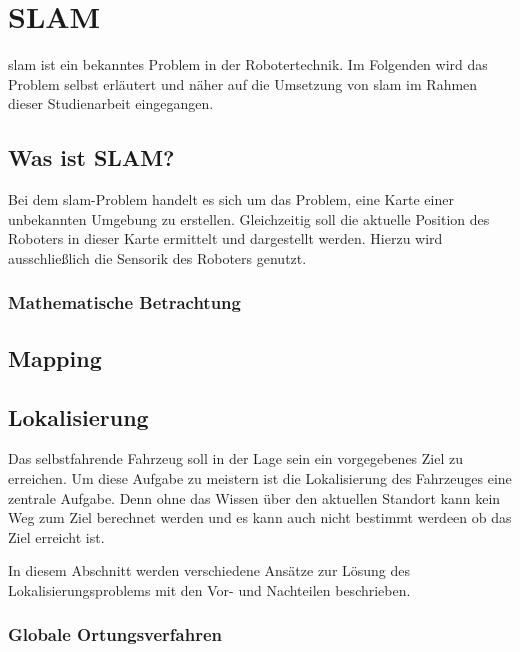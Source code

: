\section{SLAM}
\ac{slam} ist ein bekanntes Problem in der Robotertechnik. 
Im Folgenden wird das Problem selbst erläutert und näher auf die Umsetzung von \ac{slam} im Rahmen dieser Studienarbeit eingegangen.

\subsection{Was ist SLAM?}
Bei dem \ac{slam}-Problem handelt es sich um das Problem, eine Karte einer unbekannten Umgebung zu erstellen.
Gleichzeitig soll die aktuelle Position des Roboters in dieser Karte ermittelt und dargestellt werden.
Hierzu wird ausschließlich die Sensorik des Roboters genutzt.

\subsubsection{Mathematische Betrachtung}


\subsection{Mapping}

\subsection{Lokalisierung}
Das selbstfahrende Fahrzeug soll in der Lage sein ein vorgegebenes Ziel zu erreichen. 
Um diese Aufgabe zu meistern ist die Lokalisierung des Fahrzeuges eine zentrale Aufgabe. 
Denn ohne das Wissen über den aktuellen Standort kann kein Weg zum Ziel berechnet werden 
und es kann auch nicht bestimmt werdeen ob das Ziel erreicht ist.

In diesem Abschnitt werden verschiedene Ansätze zur Lösung des Lokalisierungsproblems mit den Vor- und Nachteilen beschrieben.

\subsubsection{Globale Ortungsverfahren}

